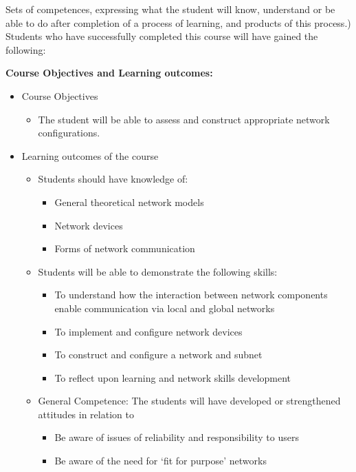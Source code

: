 {Sets of competences, expressing what the student will know, understand or be able to
do after completion of a process of learning, and products of this process.) Students who have successfully completed this course will have gained the following:

{\bfseries{Course Objectives and Learning outcomes:}}
\begin{itemize}
    \item Course Objectives
        \begin{itemize}
            \item The student will be able to assess and construct appropriate network configurations.
        \end{itemize}
    \item Learning outcomes of the course
    \begin{itemize}
        \item Students should have knowledge of:
            \begin{itemize}
                \item General theoretical network models
                \item Network devices
                \item Forms of network communication
            \end{itemize}
        \item Students will be able to demonstrate the following skills:
            \begin{itemize}
                \item To understand how the interaction between network components enable communication via local and global networks
                \item To implement and configure network devices
                \item To construct and configure a network and subnet
                \item To reflect upon learning and network skills development
            \end{itemize}
        \item General Competence: The students will have developed or strengthened attitudes in
        relation to
            \begin{itemize}
                \item Be aware of issues of reliability and responsibility to users
                \item Be aware of the need for ‘fit for purpose’ networks
            \end{itemize}
    \end{itemize}
\end{itemize}

}
